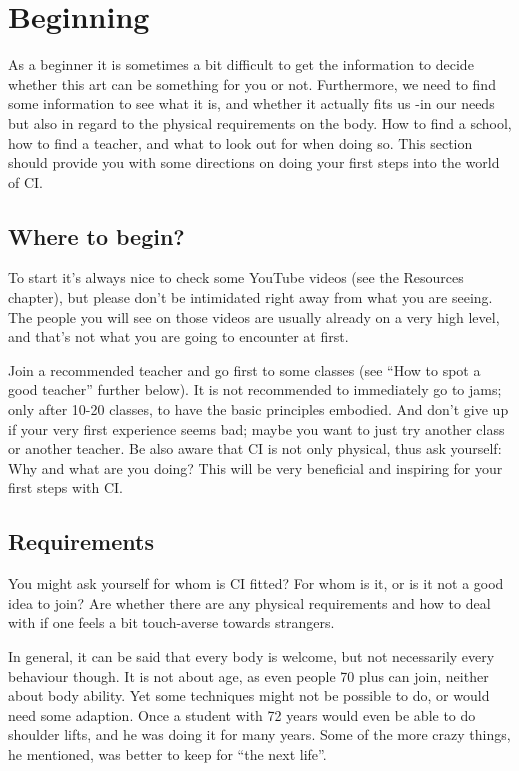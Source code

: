 \section{Beginning}\label{sec:beginning}

As a beginner it is sometimes a bit difficult to get the information to decide whether this art can be something for you or not.
Furthermore, we need to find some information to see what it is, and whether it actually fits us -in our needs but also in regard to the physical requirements on the body.
How to find a school, how to find a teacher, and what to look out for when doing so.
This section should provide you with some directions on doing your first steps into the world of CI.

\subsection{Where to begin?}\label{subsec:where-to-begin?}

To start it's always nice to check some YouTube videos (see the Resources chapter), but please don't be intimidated right away from what you are seeing.
The people you will see on those videos are usually already on a very high level, and that's not what you are going to encounter at first.

Join a recommended teacher and go first to some classes (see ``How to spot a good teacher'' further below).
It is not recommended to immediately go to jams; only after 10-20 classes, to have the basic principles embodied.
And don't give up if your very first experience seems bad; maybe you want to just try another class or another teacher.
Be also aware that CI is not only physical, thus ask yourself: Why and what are you doing?
This will be very beneficial and inspiring for your first steps with CI.

\subsection{Requirements}\label{subsec:requirements}

You might ask yourself for whom is CI fitted?
For whom is it, or is it not a good idea to join?
Are whether there are any physical requirements and how to deal with if one feels a bit touch-averse towards strangers.

In general, it can be said that every body is welcome, but not necessarily every behaviour though.
It is not about age, as even people 70 plus can join, neither about body ability.
Yet some techniques might not be possible to do, or would need some adaption.
Once a student with 72 years would even be able to do shoulder lifts, and he was doing it for many years.
Some of the more crazy things, he mentioned, was better to keep for ``the next life''.

